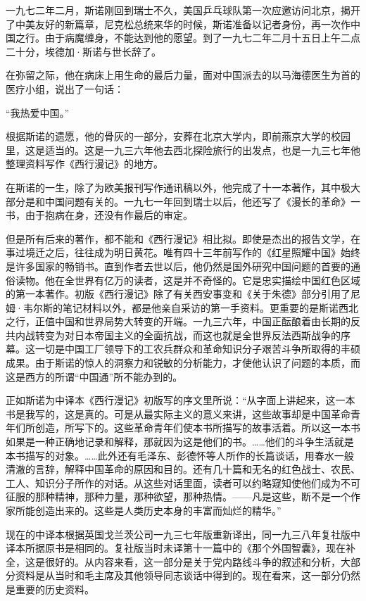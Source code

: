 \documentclass[10pt]{book}
\begin{document}
一九七二年二月，斯诺刚回到瑞士不久，美国乒乓球队第一次应邀访问北京，揭开了中美友好的新篇章，尼克松总统来华的时候，斯诺准备以记者身份，再一次作中国之行。由于病魔缠身，不能达到他的愿望。到了一九七二年二月十五日上午二点二十分，埃德加·斯诺与世长辞了。

在弥留之际，他在病床上用生命的最后力量，面对中国派去的以马海德医生为首的医疗小组，说出了一句话：

“我热爱中国。”

根据斯诺的遗愿，他的骨灰的一部分，安葬在北京大学内，即前燕京大学的校园里，这是适当的。这是一九三六年他去西北探险旅行的出发点，也是一九三七年他整理资料写作《西行漫记》的地方。

在斯诺的一生，除了为欧美报刊写作通讯稿以外，他完成了十一本著作，其中极大部分是和中国问题有关的。一九七一年回到瑞士以后，他还写了《漫长的革命》一书，由于抱病在身，还没有作最后的审定。

但是所有后来的著作，都不能和《西行漫记》相比拟。即使是杰出的报告文学，在事过境迁之后，往往成为明日黄花。唯有四十三年前写作的《红星照耀中国》始终是许多国家的畅销书。直到作者去世以后，他仍然是国外研究中国问题的首要的通俗读物。他在全世界有亿万的读者，这是并不奇怪的。它是忠实描绘中国红色区域的第一本著作。初版《西行漫记》除了有关西安事变和《关于朱德》部分引用了尼姆·韦尔斯的笔记材料以外，都是他亲自采访的第一手资料。更重要的是斯诺西北之行，正值中国和世界局势大转变的开端。一九三六年，中国正酝酿着由长期的反共内战转变为对日本帝国主义的全面抗战，而这也就是全世界反法西斯战争的序幕。这一切是中国工厂领导下的工农兵群众和革命知识分子艰苦斗争所取得的丰硕成果。由于斯诺的惊人的洞察力和锐敏的分析能力，才使他认识了问题的本质，而这是西方的所谓“中国通”所不能办到的。

正如斯诺为中译本《西行漫记》初版写的序文里所说：“从字面上讲起来，这一本书是我写的，这是真的。可是从最实际主义的意义来讲，这些故事却是中国革命青年们所创造，所写下的。这些革命青年们使本书所描写的故事活着。所以这一本书如果是一种正确地记录和解释，那就因为这是他们的书。……他们的斗争生活就是本书描写的对象。……此外还有毛泽东、彭德怀等人所作的长篇谈话，用春水一般清澈的言辞，解释中国革命的原因和目的。还有几十篇和无名的红色战士、农民、工人、知识分子所作的对话。从这些对话里面，读者可以约略窥知使他们成为不可征服的那种精神，那种力量，那种欲望，那种热情。——凡是这些，断不是一个作家所能创造出来的。这些是人类历史本身的丰富而灿烂的精华。”

现在的中译本根据英国戈兰茨公司一九三七年版重新译出，同一九三八年复社版中译本所据原书是相同的。复社版当时未译第十一篇中的《那个外国智囊》，现在补全，这是很好的。从内容来看，这一部分是关于党内路线斗争的叙述和分析，大部分资料是从当时和毛主席及其他领导同志谈话中得到的。现在看来，这一部分仍然是重要的历史资料。
\end{document}
